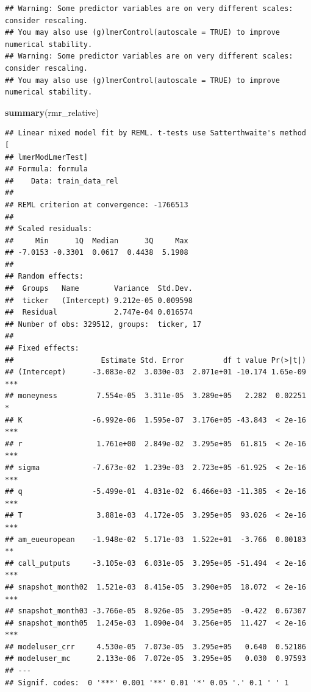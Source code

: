 \documentclass[
]{article}
\newenvironment{Shaded}{\begin{snugshade}}{\end{snugshade}}
\newcommand{\FunctionTok}[1]{\textcolor[rgb]{0.13,0.29,0.53}{\textbf{#1}}}
\newcommand{\NormalTok}[1]{#1}
\begin{document}
\begin{verbatim}
## Warning: Some predictor variables are on very different scales: consider rescaling. 
## You may also use (g)lmerControl(autoscale = TRUE) to improve numerical stability.
## Warning: Some predictor variables are on very different scales: consider rescaling. 
## You may also use (g)lmerControl(autoscale = TRUE) to improve numerical stability.
\end{verbatim}

\begin{Shaded}
\begin{Highlighting}[]
\FunctionTok{summary}\NormalTok{(rmr\_relative)}
\end{Highlighting}
\end{Shaded}

\begin{verbatim}
## Linear mixed model fit by REML. t-tests use Satterthwaite's method [
## lmerModLmerTest]
## Formula: formula
##    Data: train_data_rel
## 
## REML criterion at convergence: -1766513
## 
## Scaled residuals: 
##     Min      1Q  Median      3Q     Max 
## -7.0153 -0.3301  0.0617  0.4438  5.1908 
## 
## Random effects:
##  Groups   Name        Variance  Std.Dev.
##  ticker   (Intercept) 9.212e-05 0.009598
##  Residual             2.747e-04 0.016574
## Number of obs: 329512, groups:  ticker, 17
## 
## Fixed effects:
##                    Estimate Std. Error         df t value Pr(>|t|)    
## (Intercept)      -3.083e-02  3.030e-03  2.071e+01 -10.174 1.65e-09 ***
## moneyness         7.554e-05  3.311e-05  3.289e+05   2.282  0.02251 *  
## K                -6.992e-06  1.595e-07  3.176e+05 -43.843  < 2e-16 ***
## r                 1.761e+00  2.849e-02  3.295e+05  61.815  < 2e-16 ***
## sigma            -7.673e-02  1.239e-03  2.723e+05 -61.925  < 2e-16 ***
## q                -5.499e-01  4.831e-02  6.466e+03 -11.385  < 2e-16 ***
## T                 3.881e-03  4.172e-05  3.295e+05  93.026  < 2e-16 ***
## am_eueuropean    -1.948e-02  5.171e-03  1.522e+01  -3.766  0.00183 ** 
## call_putputs     -3.105e-03  6.031e-05  3.295e+05 -51.494  < 2e-16 ***
## snapshot_month02  1.521e-03  8.415e-05  3.290e+05  18.072  < 2e-16 ***
## snapshot_month03 -3.766e-05  8.926e-05  3.295e+05  -0.422  0.67307    
## snapshot_month05  1.245e-03  1.090e-04  3.256e+05  11.427  < 2e-16 ***
## modeluser_crr     4.530e-05  7.073e-05  3.295e+05   0.640  0.52186    
## modeluser_mc      2.133e-06  7.072e-05  3.295e+05   0.030  0.97593    
## ---
## Signif. codes:  0 '***' 0.001 '**' 0.01 '*' 0.05 '.' 0.1 ' ' 1
\end{verbatim}
\end{document}
